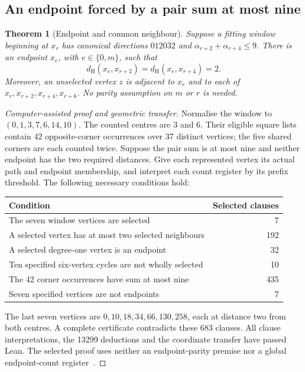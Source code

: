 \documentclass[11pt,a4paper]{article}
\newtheorem{theorem}{Theorem}[section]
\theoremstyle{definition}
\theoremstyle{remark}
\newcommand{\Ham}{d_{\mathrm H}}
\begin{document}
\subsection{An endpoint forced by a pair sum at most nine}\label{sec:small-pair-endpoint}
\begin{theorem}[Endpoint and common neighbour]\label{thm:small-pair-endpoint}
Suppose a fitting window beginning at $x_r$ has canonical directions
$012032$ and $\alpha_{r+2}+\alpha_{r+4}\le9$. There is an endpoint
$x_e$, with $e\in\{0,m\}$, such that
\[
\Ham(x_e,x_{r+2})=\Ham(x_e,x_{r+4})=2.
\]
Moreover, an unselected vertex $z$ is adjacent to $x_e$ and to each of
$x_r,x_{r+2},x_{r+4},x_{r+6}$. No parity assumption on $m$ or $r$ is needed.
\end{theorem}
\begin{proof}[Computer-assisted proof and geometric transfer]
Normalise the window to $(0,1,3,7,6,14,10)$. The counted centres are 3 and 6.
Their eligible square lists contain 42 opposite-corner occurrences over
37 distinct vertices; the five shared corners are each counted twice.
Suppose the pair sum is at most nine and neither endpoint has the two
required distances. Give each represented vertex its actual path and
endpoint membership, and interpret each count register by its prefix threshold.
The following necessary conditions hold:
\begin{center}\small
\begin{tabular}{l r}
\toprule Condition & Selected clauses\\\midrule
The seven window vertices are selected & 7\\
A selected vertex has at most two selected neighbours & 192\\
A selected degree-one vertex is an endpoint & 32\\
Ten specified six-vertex cycles are not wholly selected & 10\\
The 42 corner occurrences have sum at most nine & 435\\
Seven specified vertices are not endpoints & 7\\\bottomrule
\end{tabular}
\end{center}
The last seven vertices are $0,10,18,34,66,130,258$, each at distance two
from both centres. A complete certificate contradicts these 683 clauses.
All clause interpretations, the 13299 deductions and the coordinate transfer
have passed Lean. The selected proof uses neither an endpoint-parity premise
nor a global endpoint-count register~\cite{lowpairarchive}.


\end{proof}
\end{document}

